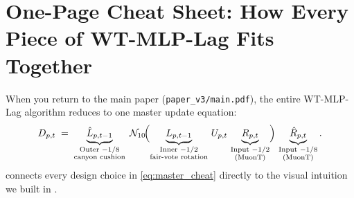 \documentclass[11pt]{article}
\newcommand{\Nten}{\mathcal{N}_{10}}
\newcommand{\mname}[1]{#1}
\begin{document}
\section{One-Page Cheat Sheet: How Every Piece of WT-MLP-Lag Fits Together}
\label{sec:cheatsheet}

When you return to the main paper (\texttt{paper\_v3/main.pdf}), the entire \mname{WT-MLP-Lag} algorithm reduces to one master update equation:
\begin{equation}
  D_{p,t} \;=\;
  \underbrace{\hat{L}_{p,t-1}}_{\substack{\text{Outer }-1/8\\\text{canyon cushion}}}
  \;\Nten\!\Bigl(
    \underbrace{L_{p,t-1}}_{\substack{\text{Inner }-1/2\\\text{fair-vote rotation}}}
    \,U_{p,t}\,
    \underbrace{R_{p,t}}_{\substack{\text{Input }-1/2\\\text{(\mname{MuonT})}}}
  \Bigr)\,
  \underbrace{\hat{R}_{p,t}}_{\substack{\text{Input }-1/8\\\text{(\mname{MuonT})}}}.
  \label{eq:master_cheat}
\end{equation}
 connects every design choice in \eqref{eq:master_cheat} directly to the visual intuition we built in .
\end{document}
